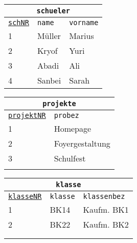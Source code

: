 \begin{Answer}[ref=Normal0]
	\begin{minipage}[t]{\textwidth}
		\begin{minipage}{0.33\textwidth}
			\begin{tabular}{lll}
				\multicolumn{3}{c}{\lstinline!schueler!}\\
				\hline
				\underline{\lstinline!schNR!}&\lstinline!name!&\lstinline!vorname!\\
				\hline
				1&Müller&Marius\\
				2&Kryof&Yuri\\
				3&Abadi&Ali\\
				4&Sanbei&Sarah\\
			\end{tabular}
		\end{minipage}
		\begin{minipage}[t]{0.33\textwidth}
			\begin{tabular}{ll}
				\multicolumn{2}{c}{\lstinline!projekte!}\\
				\hline
				\underline{\lstinline!projektNR!}&\lstinline!probez!\\
				\hline
				1&Homepage\\
				2&Foyergestaltung\\
				3&Schulfest\\
				\phantom{text}&\\
			\end{tabular}
		\end{minipage}
		\begin{minipage}[t]{0.33\textwidth}
			\begin{tabular}{lll}
				\multicolumn{3}{c}{\lstinline!klasse!}\\
				\hline
				\underline{\lstinline!klasseNR!}&\lstinline!klasse!&\lstinline!klassenbez!\\
				\hline
				1&BK14&Kaufm. BK1\\
				2&BK22&Kaufm. BK2\\
				\phantom{text}&&\\
				\phantom{text}&&\\
			\end{tabular}
		\end{minipage}
	\end{minipage}
	\begin{minipage}{\textwidth}
		\begin{minipage}{0.33\textwidth}
			\begin{tabular}{ll}

\end{tabular}
\end{minipage}
\end{minipage}
\end{Answer}
